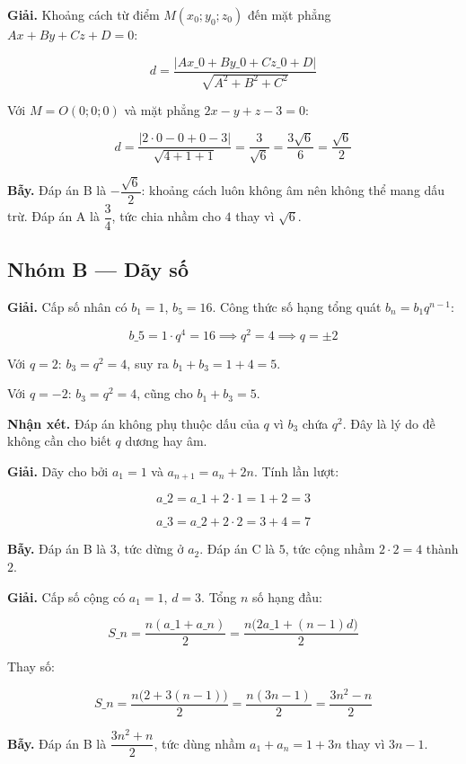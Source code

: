 \documentclass[11pt, a4paper]{article}
\begin{document}
\begin{dapan}[12 — Đáp án C]
\textbf{Giải.} Khoảng cách từ điểm $M(x_0;y_0;z_0)$ đến mặt phẳng $Ax + By + Cz + D = 0$:

$$d = \frac{|Ax\_0 + By\_0 + Cz\_0 + D|}{\sqrt{A^2+B^2+C^2}}$$

Với $M = O(0;0;0)$ và mặt phẳng $2x - y + z - 3 = 0$:

$$d = \frac{|2 \cdot 0 - 0 + 0 - 3|}{\sqrt{4+1+1}} = \frac{3}{\sqrt{6}} = \frac{3\sqrt{6}}{6} = \frac{\sqrt{6}}{2}$$

\textbf{Bẫy.} Đáp án B là $-\dfrac{\sqrt{6}}{2}$: khoảng cách luôn không âm nên không thể mang dấu trừ. Đáp án A là $\dfrac{3}{4}$, tức chia nhầm cho $4$ thay vì $\sqrt{6}$.
\end{dapan}

\subsection*{Nhóm B — Dãy số}

\begin{dapan}[13 — Đáp án A]
\textbf{Giải.} Cấp số nhân có $b_1 = 1$, $b_5 = 16$. Công thức số hạng tổng quát $b_n = b_1 q^{n-1}$:

$$b\_5 = 1 \cdot q^4 = 16 \implies q^2 = 4 \implies q = \pm 2$$

Với $q = 2$: $b_3 = q^2 = 4$, suy ra $b_1 + b_3 = 1 + 4 = 5$.

Với $q = -2$: $b_3 = q^2 = 4$, cũng cho $b_1 + b_3 = 5$.

\textbf{Nhận xét.} Đáp án không phụ thuộc dấu của $q$ vì $b_3$ chứa $q^2$. Đây là lý do đề không cần cho biết $q$ dương hay âm.
\end{dapan}

\begin{dapan}[14 — Đáp án D]
\textbf{Giải.} Dãy cho bởi $a_1 = 1$ và $a_{n+1} = a_n + 2n$. Tính lần lượt:

$$a\_2 = a\_1 + 2 \cdot 1 = 1 + 2 = 3$$

$$a\_3 = a\_2 + 2 \cdot 2 = 3 + 4 = 7$$

\textbf{Bẫy.} Đáp án B là $3$, tức dừng ở $a_2$. Đáp án C là $5$, tức cộng nhầm $2 \cdot 2 = 4$ thành $2$.
\end{dapan}

\begin{dapan}[15 — Đáp án C]
\textbf{Giải.} Cấp số cộng có $a_1 = 1$, $d = 3$. Tổng $n$ số hạng đầu:

$$S\_n = \frac{n(a\_1 + a\_n)}{2} = \frac{n\big(2a\_1 + (n-1)d\big)}{2}$$

Thay số:

$$S\_n = \frac{n\big(2 + 3(n-1)\big)}{2} = \frac{n(3n - 1)}{2} = \frac{3n^2 - n}{2}$$

\textbf{Bẫy.} Đáp án B là $\dfrac{3n^2+n}{2}$, tức dùng nhầm $a_1 + a_n = 1 + 3n$ thay vì $3n - 1$.
\end{dapan}
\end{document}
